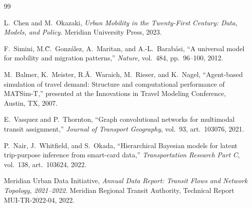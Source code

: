 \documentclass[12pt,letterpaper,twoside]{report}
\begin{document}
\begin{thebibliography}{99}

L.\ Chen and M.\ Okazaki,
\emph{Urban Mobility in the Twenty-First Century: Data, Models, and Policy}.
Meridian University Press, 2023.

F.\ Simini, M.\~C.\ Gonz\'{a}lez, A.\ Maritan, and A.-L.\ Barab\'{a}si,
``A universal model for mobility and migration patterns,''
\emph{Nature}, vol.\ 484, pp.\ 96--100, 2012.

M.\ Balmer, K.\ Meister, R.\~A.\ Waraich, M.\ Rieser, and K.\ Nagel,
``Agent-based simulation of travel demand: Structure and computational performance of MATSim-T,''
presented at the Innovations in Travel Modeling Conference, Austin, TX, 2007.

E.\ Vasquez and P.\ Thornton,
``Graph convolutional networks for multimodal transit assignment,''
\emph{Journal of Transport Geography}, vol.\ 93, art.\ 103076, 2021.

P.\ Nair, J.\ Whitfield, and S.\ Okada,
``Hierarchical Bayesian models for latent trip-purpose inference from smart-card data,''
\emph{Transportation Research Part C}, vol.\ 138, art.\ 103624, 2022.

Meridian Urban Data Initiative,
\emph{Annual Data Report: Transit Flows and Network Topology, 2021--2022}.
Meridian Regional Transit Authority, Technical Report MUI-TR-2022-04, 2022.

\end{thebibliography}
\end{document}
